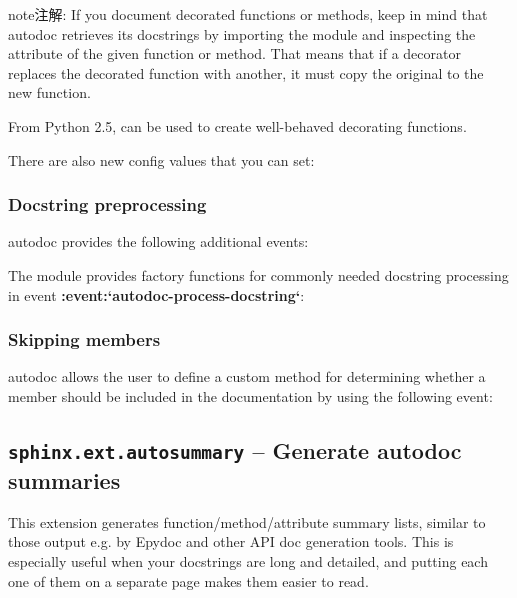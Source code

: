 \documentclass[letterpaper,10pt,english]{sphinxmanual}
\begin{document}
\begin{fulllineitems}
\begin{notice}{note}{注解:}
If you document decorated functions or methods, keep in mind that autodoc
retrieves its docstrings by importing the module and inspecting the
 attribute of the given function or method.  That means that if
a decorator replaces the decorated function with another, it must copy the
original  to the new function.

From Python 2.5,  can be used to create
well-behaved decorating functions.
\end{notice}

\end{fulllineitems}


There are also new config values that you can set:


\subsubsection{Docstring preprocessing}
\label{ext/autodoc:docstring-preprocessing}
autodoc provides the following additional events:

The {\hyperref[ext/autodoc:module\string-sphinx.ext.autodoc]{}} module provides factory functions for commonly
needed docstring processing in event {\color{red}\bfseries{}:event:{}`autodoc-process-docstring{}`}:


\subsubsection{Skipping members}
\label{ext/autodoc:skipping-members}
autodoc allows the user to define a custom method for determining whether a
member should be included in the documentation by using the following event:


\subsection{\texttt{sphinx.ext.autosummary} -- Generate autodoc summaries}
\label{ext/autosummary:module-sphinx.ext.autosummary}\label{ext/autosummary:sphinx-ext-autosummary-generate-autodoc-summaries}\label{ext/autosummary::doc}

This extension generates function/method/attribute summary lists, similar to
those output e.g. by Epydoc and other API doc generation tools.  This is
especially useful when your docstrings are long and detailed, and putting each
one of them on a separate page makes them easier to read.
\end{document}
